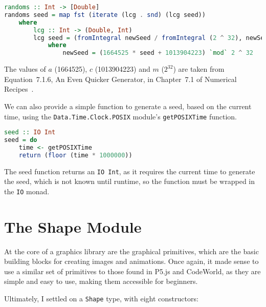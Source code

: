 \documentclass[../main.tex]{subfiles}
\begin{document}
            \begin{lstlisting}[language=Haskell, label={lst:random}, caption={The random number
                generator, which uses a linear congruential generator to generate an infinite
                list of pseudo-random numbers, mapped to the range [0, 1].}]
randoms :: Int -> [Double]
randoms seed = map fst (iterate (lcg . snd) (lcg seed))
    where
        lcg :: Int -> (Double, Int)
        lcg seed = (fromIntegral newSeed / fromIntegral (2 ^ 32), newSeed)
            where
                newSeed = (1664525 * seed + 1013904223) `mod` 2 ^ 32
            \end{lstlisting}

            The values of $a$ (1664525), $c$ (1013904223) and $m$ ($2^32$) are taken from
                Equation~7.1.6, An Even Quicker Generator, in Chapter~7.1 of Numerical
                Recipes~\citep{numericalRecipes}.

            We can also provide a simple function to generate a seed, based on the current
                time, using the \verb|Data.Time.Clock.POSIX| module's \verb|getPOSIXTime|
                function.

            \begin{lstlisting}[language=Haskell, label={lst:seed}, caption={The seed function.}]
seed :: IO Int
seed = do
    time <- getPOSIXTime
    return (floor (time * 1000000))
            \end{lstlisting}

            The seed function returns an \verb|IO Int|, as it requires the current time to
                generate the seed, which is not known until runtime, so the function must be
                wrapped in the \verb|IO| monad.

    \section{The Shape Module}
        At the core of a graphics library are the graphical primitives, which are the
            basic building blocks for creating images and animations.
        Once again, it made sense to use a similar set of primitives to those found in
            P5.js and CodeWorld, as they are simple and easy to use, making them accessible
            for beginners.

        Ultimately, I settled on a \verb|Shape| type, with eight constructors:
\end{document}
